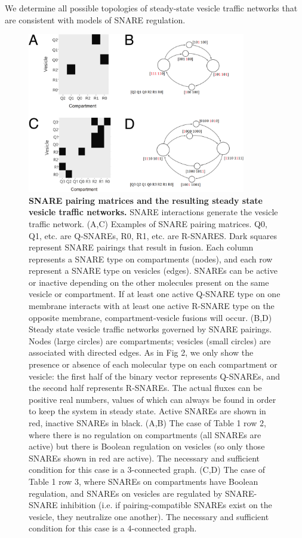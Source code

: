 \documentclass{llncs}
\begin{document}
We determine all possible topologies of steady-state vesicle traffic networks that are consistent with models of SNARE regulation.
\begin{figure}
\centering
  \includegraphics[width=0.85\textwidth]{1.png}
\caption{\textbf{SNARE pairing matrices and the resulting steady state vesicle traffic networks.} SNARE interactions generate the vesicle traffic network. (A,C) Examples of SNARE pairing matrices. Q0, Q1, etc. are Q-SNAREs, R0, R1, etc. are R-SNARES. Dark squares represent SNARE pairings that result in fusion. Each column represents a SNARE type on compartments (nodes), and each row represent a SNARE type on vesicles (edges). SNAREs can be active or inactive depending on the other molecules present on the same vesicle or compartment. If at least one active Q-SNARE type on one membrane interacts with at least one active R-SNARE type on the opposite membrane, compartment-vesicle fusions will occur. (B,D) Steady state vesicle traffic networks governed by SNARE pairings. Nodes (large circles) are compartments; vesicles (small circles) are associated with directed edges. As in Fig 2, we only show the presence or absence of each molecular type on each compartment or vesicle: the first half of the binary vector represents Q-SNAREs, and the second half represents R-SNAREs. The actual fluxes can be positive real numbers, values of which can always be found in order to keep the system in steady state. Active SNAREs are shown in red, inactive SNAREs in black. (A,B) The case of Table 1 row 2, where there is no regulation on compartments (all SNAREs are active) but there is Boolean regulation on vesicles (so only those SNAREs shown in red are active). The necessary and sufficient condition for this case is a 3-connected graph. (C,D) The case of Table 1 row 3, where SNAREs on compartments have Boolean regulation, and SNAREs on vesicles are regulated by SNARE-SNARE inhibition (i.e. if pairing-compatible SNAREs exist on the vesicle, they neutralize one another). The necessary and sufficient condition for this case is a 4-connected graph.}
   \label{fig2} 
\end{figure}
\end{document}
